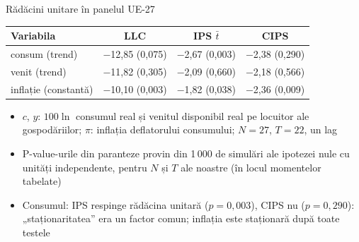 \begin{frame}{Rădăcini unitare în panelul UE-27}
\itemsize{\small}
\begin{center}
\footnotesize
\begin{tabular}{lccc}
\toprule
\textbf{Variabila} & LLC & IPS $\bar t$ & CIPS \\
\midrule
consum (trend) & \ensuremath{-}12{,}85 (0{,}075) & \ensuremath{-}2{,}67 (0{,}003) & \ensuremath{-}2{,}38 (0{,}290) \\
venit (trend) & \ensuremath{-}11{,}82 (0{,}305) & \ensuremath{-}2{,}09 (0{,}660) & \ensuremath{-}2{,}18 (0{,}566) \\
inflație (constantă) & \ensuremath{-}10{,}10 (0{,}003) & \ensuremath{-}1{,}82 (0{,}038) & \ensuremath{-}2{,}36 (0{,}009) \\
\bottomrule
\end{tabular}
\end{center}
\begin{itemize}
    \item $c$, $y$: $100\ln$ consumul real și venitul disponibil real pe locuitor ale gospodăriilor; $\pi$: inflația deflatorului consumului; $N = 27$, $T = 22$, un lag
    \item P-value-urile din paranteze provin din 1\,000 de simulări ale ipotezei nule cu unități independente, pentru $N$ și $T$ ale noastre (în locul momentelor tabelate)
    \item Consumul: IPS respinge rădăcina unitară ($p = 0{,}003$), CIPS nu ($p = 0{,}290$): „staționaritatea” era un factor comun; inflația este staționară după toate testele
\end{itemize}
\end{frame}

